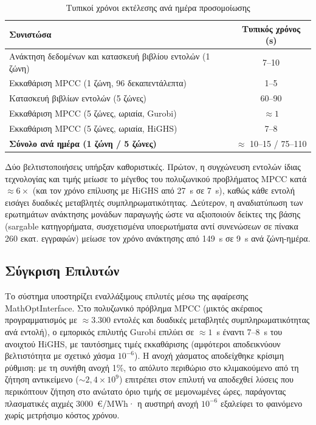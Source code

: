 \begin{table}[htbp]
\centering
\caption{Τυπικοί χρόνοι εκτέλεσης ανά ημέρα προσομοίωσης}
\label{tab:execution-times}
\begin{tabular}{@{}lc@{}}
\toprule
\textbf{Συνιστώσα} & \textbf{Τυπικός χρόνος (s)} \\
\midrule
Ανάκτηση δεδομένων και κατασκευή βιβλίου εντολών (1 ζώνη) & 7--10 \\
Εκκαθάριση MPCC (1 ζώνη, 96 δεκαπεντάλεπτα) & 1--5 \\
Κατασκευή βιβλίων εντολών (5 ζώνες) & 60--90 \\
Εκκαθάριση MPCC (5 ζώνες, ωριαία, Gurobi) & $\approx 1$ \\
Εκκαθάριση MPCC (5 ζώνες, ωριαία, HiGHS) & 7--8 \\
\midrule
\textbf{Σύνολο ανά ημέρα (1 ζώνη / 5 ζώνες)} & $\approx$ 10--15 / 75--110 \\
\bottomrule
\end{tabular}
\end{table}

Δύο βελτιστοποιήσεις υπήρξαν καθοριστικές. Πρώτον, η συγχώνευση εντολών ίδιας τεχνολογίας και τιμής μείωσε το μέγεθος του πολυζωνικού προβλήματος MPCC κατά $\approx 6\times$ (και τον χρόνο επίλυσης με HiGHS από 27~s σε 7~s), καθώς κάθε εντολή εισάγει δυαδικές μεταβλητές συμπληρωματικότητας. Δεύτερον, η αναδιατύπωση των ερωτημάτων ανάκτησης μονάδων παραγωγής ώστε να αξιοποιούν δείκτες της βάσης (sargable κατηγορήματα, συσχετισμένα υποερωτήματα αντί συνενώσεων σε πίνακα 260 εκατ. εγγραφών) μείωσε τον χρόνο ανάκτησης από 149~s σε 9~s ανά ζώνη-ημέρα.

\subsection{Σύγκριση Επιλυτών}
\label{subsec:solver-performance}

Το σύστημα υποστηρίζει εναλλάξιμους επιλυτές μέσω της αφαίρεσης MathOptInterface. Στο πολυζωνικό πρόβλημα MPCC (μικτός ακέραιος προγραμματισμός με $\approx 3.300$ εντολές και δυαδικές μεταβλητές συμπληρωματικότητας ανά εντολή), ο εμπορικός επιλυτής Gurobi επιλύει σε $\approx 1$~s έναντι 7--8~s του ανοιχτού HiGHS, με ταυτόσημες τιμές εκκαθάρισης (αμφότεροι αποδεικνύουν βελτιστότητα με σχετικό χάσμα $10^{-6}$). Η ανοχή χάσματος αποδείχθηκε κρίσιμη ρύθμιση: με τη συνήθη ανοχή 1\%, το απόλυτο περιθώριο στο κλιμακούμενο από τη ζήτηση αντικείμενο ($\sim 2{,}4 \times 10^9$) επιτρέπει στον επιλυτή να αποδεχθεί λύσεις που περικόπτουν ζήτηση στο ανώτατο όριο τιμής σε μεμονωμένες ώρες, παράγοντας πλασματικές αιχμές 3000~€/MWh· η αυστηρή ανοχή $10^{-6}$ εξαλείφει το φαινόμενο χωρίς μετρήσιμο κόστος χρόνου.

